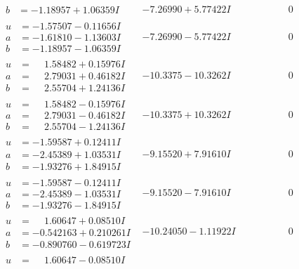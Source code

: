 \documentclass[1p]{elsarticle_modified}
\theoremstyle{definition}
\begin{document}
$$\begin{array}{c|c|c}
\begin{aligned}
b &= -1.18957 + 1.06359 I\end{aligned}
 & -7.26990 + 5.77422 I & \phantom{-0.000000 } 0 \\ \hline\begin{aligned}
u &= -1.57507 - 0.11656 I \\
a &= -1.61810 - 1.13603 I \\
b &= -1.18957 - 1.06359 I\end{aligned}
 & -7.26990 - 5.77422 I & \phantom{-0.000000 } 0 \\ \hline\begin{aligned}
u &= \phantom{-}1.58482 + 0.15976 I \\
a &= \phantom{-}2.79031 + 0.46182 I \\
b &= \phantom{-}2.55704 + 1.24136 I\end{aligned}
 & -10.3375 - 10.3262 I & \phantom{-0.000000 } 0 \\ \hline\begin{aligned}
u &= \phantom{-}1.58482 - 0.15976 I \\
a &= \phantom{-}2.79031 - 0.46182 I \\
b &= \phantom{-}2.55704 - 1.24136 I\end{aligned}
 & -10.3375 + 10.3262 I & \phantom{-0.000000 } 0 \\ \hline\begin{aligned}
u &= -1.59587 + 0.12411 I \\
a &= -2.45389 + 1.03531 I \\
b &= -1.93276 + 1.84915 I\end{aligned}
 & -9.15520 + 7.91610 I & \phantom{-0.000000 } 0 \\ \hline\begin{aligned}
u &= -1.59587 - 0.12411 I \\
a &= -2.45389 - 1.03531 I \\
b &= -1.93276 - 1.84915 I\end{aligned}
 & -9.15520 - 7.91610 I & \phantom{-0.000000 } 0 \\ \hline\begin{aligned}
u &= \phantom{-}1.60647 + 0.08510 I \\
a &= -0.542163 + 0.210261 I \\
b &= -0.890760 - 0.619723 I\end{aligned}
 & -10.24050 - 1.11922 I & \phantom{-0.000000 } 0 \\ \hline\begin{aligned}
u &= \phantom{-}1.60647 - 0.08510 I \\

\end{aligned}
\end{array}$$
\end{document}
